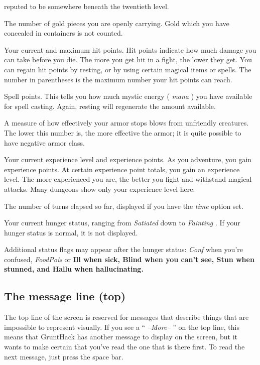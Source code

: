 reputed to be somewhere beneath the twentieth level.
\item[\bb{``Gold  ''}]
The number of gold pieces you are openly carrying.  Gold which you have
concealed in containers is not counted.
\item[\bb{Hit Points}]
Your current and maximum hit points.  Hit points indicate how much
damage you can take before you die.  The more you get hit in a fight,
the lower they get.  You can regain hit points by resting, or by using
certain magical items or spells.  The number in parentheses is the maximum
number your hit points can reach.
\item[\bb{Power}]
Spell points.  This tells you how much mystic energy (%
{\it  mana}%
)
you have available for spell casting.  Again, resting will regenerate the
amount available.
\item[\bb{Armor Class}]
A measure of how effectively your armor stops blows from unfriendly
creatures.  The lower this number is, the more effective the armor; it
is quite possible to have negative armor class. 
\item[\bb{Experience}]
Your current experience level and experience points.  As you
adventure, you gain experience points.  At certain experience point
totals, you gain an experience level.  The more experienced you are,
the better you fight and withstand magical attacks.  Many dungeons
show only your experience level here.
\item[\bb{Time}]
The number of turns elapsed so far, displayed if you have the
{\it time}
option set.
\item[\bb{Hunger status}]
Your current hunger status, ranging from %
{\it Satiated}
down to
%
{\it  Fainting}%
.  If your hunger status is normal, it is not displayed.

Additional status flags may appear after the hunger status:  %
{\it Conf}
when you're confused, %
{\it FoodPois}
or %
\bf Ill \rm%
when sick, %
\bf Blind \rm%
when you can't
see, %
\bf Stun \rm%
when stunned, and %
\bf Hallu \rm%
when hallucinating.
\elist
\subsection*{The message line (top)}

The top line of the screen is reserved for messages that describe
things that are impossible to represent visually.  If you see a
``%
{\it  --More--}%
'' on the top line, this means that GruntHack has
another message to display on the screen, but it wants to make certain
that you've read the one that is there first.  To read the next message,
just press the space bar.
